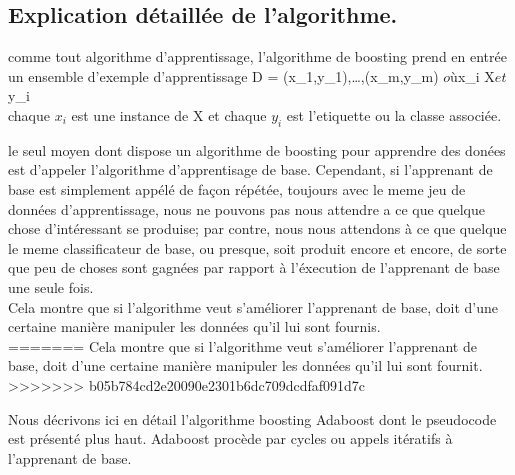 \documentclass[french,a4paper,12pt]{article}
\begin{document}
\subsection{Explication détaillée de l'algorithme.}\citep{schapire}




\quad comme tout algorithme d'apprentissage, l'algorithme de boosting prend en entrée un ensemble d'exemple d'apprentissage  D = {(x_1,y_1),\ldots,(x_m,y_m)} $ où $x_i \in X$ et  $y_i  \in [{-1,+1}]\\



\quad chaque $x_i$ est une instance de X  et chaque $y_i$ est l'etiquette ou la classe  associée. 




\quad le seul moyen dont dispose un algorithme de boosting pour apprendre des donées est d'appeler l'algorithme d'apprentisage de base. Cependant, si l'apprenant de base est simplement appélé de façon répétée, toujours avec le meme jeu de données d'apprentissage, nous ne pouvons pas nous attendre a ce que quelque chose d'intéressant se produise; par contre, nous nous attendons à ce que quelque le meme classificateur de base, ou presque, soit produit encore et encore, de sorte que peu de choses sont gagnées par rapport à l'éxecution de l'apprenant de base une seule fois.\\ 


\quad Cela montre que si l'algorithme veut s'améliorer l'apprenant de base, doit d'une certaine manière manipuler les données qu'il lui sont fournis.\\
=======
\quad Cela montre que si l'algorithme veut s'améliorer l'apprenant de base, doit d'une certaine manière manipuler les données qu'il lui sont fournit.\\
>>>>>>> b05b784cd2e20090e2301b6dc709dcdfaf091d7c


\quad Nous décrivons ici en détail l'algorithme boosting Adaboost dont le pseudocode est présenté plus haut. Adaboost procède par cycles ou appels itératifs à l'apprenant de base. \\
\end{document}
